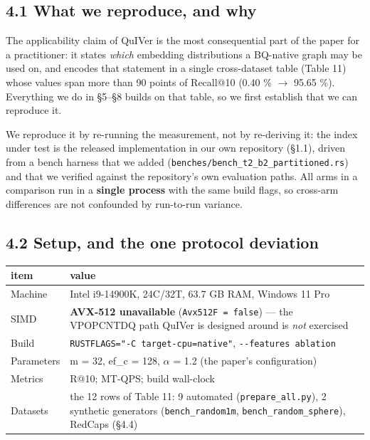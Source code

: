 \documentclass[
  10pt,
]{article}
\newcounter{none} %
\begin{document}
\subsection{4.1 What we reproduce, and
why}\label{what-we-reproduce-and-why}

The applicability claim of QuIVer is the most consequential part of the
paper for a practitioner: it states \emph{which} embedding distributions
a BQ-native graph may be used on, and encodes that statement in a single
cross-dataset table (Table 11) whose values span more than 90 points of
Recall@10 (0.40 \% $\rightarrow$ 95.65 \%). Everything we do in §5--§8 builds on
that table, so we first establish that we can reproduce it.

We reproduce it by re-running the measurement, not by re-deriving it:
the index under test is the released implementation in our own
repository (§1.1), driven from a bench harness that we added
(\texttt{benches/bench\_t2\_b2\_partitioned.rs}) and that we verified
against the repository's own evaluation paths. All arms in a comparison
run in a \textbf{single process} with the same build flags, so cross-arm
differences are not confounded by run-to-run variance.

\subsection{4.2 Setup, and the one protocol
deviation}\label{setup-and-the-one-protocol-deviation}

{\def\LTcaptype{none} %
\begin{longtable}[]{@{}
  >{\raggedright\arraybackslash}p{}
  >{\raggedright\arraybackslash}p{}@{}}
\toprule\noalign{}
\begin{minipage}[b]{\linewidth}\raggedright
item
\end{minipage} & \begin{minipage}[b]{\linewidth}\raggedright
value
\end{minipage} \\
\midrule\noalign{}
\endhead
\bottomrule\noalign{}
\endlastfoot
Machine & Intel i9-14900K, 24C/32T, 63.7 GB RAM, Windows 11 Pro \\
SIMD & \textbf{AVX-512 unavailable} (\texttt{Avx512F\ =\ false}) --- the
VPOPCNTDQ path QuIVer is designed around is \emph{not} exercised \\
Build & \texttt{RUSTFLAGS="-C\ target-cpu=native"},
\texttt{-\/-features\ ablation} \\
Parameters & m = 32, ef\_c = 128, $\alpha$ = 1.2 (the paper's configuration) \\
Metrics & R@10; MT-QPS; build wall-clock \\
Datasets & the 12 rows of Table 11: 9 automated
(\texttt{prepare\_all.py}), 2 synthetic generators
(\texttt{bench\_random1m}, \texttt{bench\_random\_sphere}), RedCaps
(§4.4) \\
\end{longtable}
}
\end{document}
